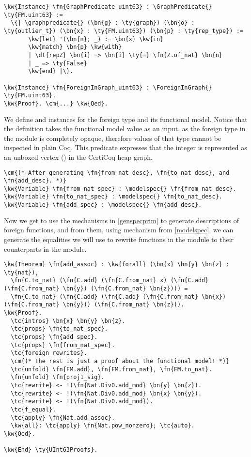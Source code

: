 \begin{Verbatim}
\kw{Instance} \fn{GraphPredicate_uint63} : \GraphPredicate{} \ty{FM.uint63} :=
  \{| \graphpredicate{} (\bn{g} : \ty{graph}) (\bn{o} : \ty{outlier_t}) (\bn{x} : \ty{FM.uint63}) (\bn{p} : \ty{rep_type}) :=
       \kw{let} '(\bn{n}; _) := \bn{x} \kw{in}
       \kw{match} \bn{p} \kw{with}
       | \dt{repZ} \bn{i} => \bn{i} \ty{=} \fn{Z.of_nat} \bn{n}
       | _ => \ty{False}
       \kw{end} |\}.

\kw{Instance} \fn{ForeignInGraph_uint63} : \ForeignInGraph{} \ty{FM.uint63}.
\kw{Proof}. \cm{...} \kw{Qed}.
\end{Verbatim}

We define \GraphPredicate{} and \ForeignInGraph{} instances for the \gls{foreign type} and its \gls{functional model}. Notice that the \graphpredicate{} definition takes the \gls{functional model} value as an input, as the \gls{foreign type} in the  module is completely opaque, therefore values of that type cannot be inspected in plain Coq.
This predicate expresses that the integer is represented as an unboxed vertex () in the \gls{CertiCoq heap} graph.

\begin{Verbatim}
\cm{(* After generating \fn{from_nat_desc}, \fn{to_nat_desc}, and \fn{add_desc}. *)}
\kw{Variable} \fn{from_nat_spec} : \modelspec{} \fn{from_nat_desc}.
\kw{Variable} \fn{to_nat_spec} : \modelspec{} \fn{to_nat_desc}.
\kw{Variable} \fn{add_spec} : \modelspec{} \fn{add_desc}.
\end{Verbatim}

Now we get to use the mechanisms in \autoref{genspecprim} to generate descriptions of \gls{foreign function}s, and from them, using \modelspec{} mechanism from \autoref{modelspec}, we can generate the equalities we will use to rewrite functions in the  module to their counterparts in the  module.

\begin{Verbatim}
\kw{Theorem} \fn{add_assoc} : \kw{forall} (\bn{x} \bn{y} \bn{z} : \ty{nat}),
  \fn{C.to_nat} (\fn{C.add} (\fn{C.from_nat} x) (\fn{C.add} (\fn{C.from_nat} \bn{y}) (\fn{C.from_nat} \bn{z}))) =
  \fn{C.to_nat} (\fn{C.add} (\fn{C.add} (\fn{C.from_nat} \bn{x}) (\fn{C.from_nat} \bn{y})) (\fn{C.from_nat} \bn{z})).
\kw{Proof}.
  \tc{intros} \bn{x} \bn{y} \bn{z}.
  \tc{props} \fn{to_nat_spec}.
  \tc{props} \fn{add_spec}.
  \tc{props} \fn{from_nat_spec}.
  \tc{foreign_rewrites}.
  \cm{(* The rest is just a proof about the functional model! *)}
  \tc{unfold} \fn{FM.add}, \fn{FM.from_nat}, \fn{FM.to_nat}.
  \fn{unfold} \fn{proj1_sig}.
  \tc{rewrite} <- !(\fn{Nat.Div0.add_mod} \bn{y} \bn{z}).
  \tc{rewrite} <- !(\fn{Nat.Div0.add_mod} \bn{x} \bn{y}).
  \tc{rewrite} <- !(\fn{Nat.Div0.add_mod}).
  \tc{f_equal}.
  \tc{apply} \fn{Nat.add_assoc}.
  \kw{all}: \tc{apply} \fn{Nat.pow_nonzero}; \tc{auto}.
\kw{Qed}.

\kw{End} \ty{UInt63Proofs}.
\end{Verbatim}

